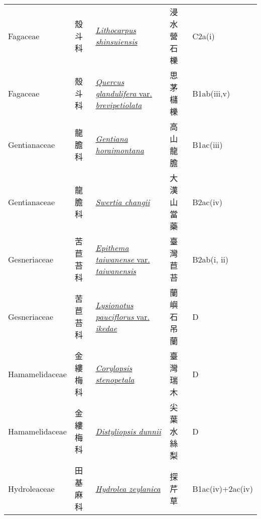 {\begin{longtable}{p{2.5cm}p{2.5cm}p{4.5cm}p{2.5cm}p{3cm}}
    Fagaceae & 殼斗科 & \href{http://www.theplantlist.org/tpl1.1/search?q=Lithocarpus+shinsuiensis}{\textit{Lithocarpus shinsuiensis} } & 浸水營石櫟 & C2a(i) \index{Lithocarpus@\textit{Lithocarpus}!shinsuiensis@\textit{shinsuiensis}}  \index{浸水營石櫟} \\
    Fagaceae & 殼斗科 & \href{http://www.theplantlist.org/tpl1.1/search?q=Quercus+glandulifera+var.+brevipetiolata}{\textit{Quercus glandulifera} var. \textit{brevipetiolata} } & 思茅櫧櫟 & B1ab(iii,v) \index{Quercus@\textit{Quercus}!glandulifera@\textit{glandulifera}!var. brevipetiolata@var. \textit{brevipetiolata}}  \index{思茅櫧櫟} \\
    Gentianaceae & 龍膽科 & \href{http://www.theplantlist.org/tpl1.1/search?q=Gentiana+horaimontana}{\textit{Gentiana horaimontana} } & 高山龍膽 & B1ac(iii) \index{Gentiana@\textit{Gentiana}!horaimontana@\textit{horaimontana}}  \index{高山龍膽} \\
    Gentianaceae & 龍膽科 & \href{http://www.theplantlist.org/tpl1.1/search?q=Swertia+changii}{\textit{Swertia changii} } & 大漢山當藥 & B2ac(iv) \index{Swertia@\textit{Swertia}!changii@\textit{changii}}  \index{大漢山當藥} \\
    Gesneriaceae & 苦苣苔科 & \href{http://www.theplantlist.org/tpl1.1/search?q=Epithema+taiwanense+var.+taiwanensis}{\textit{Epithema taiwanense} var. \textit{taiwanensis} } & 臺灣苣苔 & B2ab(i, ii) \index{Epithema@\textit{Epithema}!taiwanense@\textit{taiwanense}!var. taiwanensis@var. \textit{taiwanensis}}  \index{臺灣苣苔} \\
    Gesneriaceae & 苦苣苔科 & \href{http://www.theplantlist.org/tpl1.1/search?q=Lysionotus+pauciflorus+var.+ikedae}{\textit{Lysionotus pauciflorus} var. \textit{ikedae} } & 蘭嶼石吊蘭 & D \index{Lysionotus@\textit{Lysionotus}!pauciflorus@\textit{pauciflorus}!var. ikedae@var. \textit{ikedae}}  \index{蘭嶼石吊蘭} \\
    Hamamelidaceae & 金縷梅科 & \href{http://www.theplantlist.org/tpl1.1/search?q=Corylopsis+stenopetala}{\textit{Corylopsis stenopetala} } & 臺灣瑞木 & D \index{Corylopsis@\textit{Corylopsis}!stenopetala@\textit{stenopetala}}  \index{臺灣瑞木} \\
    Hamamelidaceae & 金縷梅科 & \href{http://www.theplantlist.org/tpl1.1/search?q=Distyliopsis+dunnii}{\textit{Distyliopsis dunnii} } & 尖葉水絲梨 & D \index{Distyliopsis@\textit{Distyliopsis}!dunnii@\textit{dunnii}}  \index{尖葉水絲梨} \\
    Hydroleaceae & 田基麻科 & \href{http://www.theplantlist.org/tpl1.1/search?q=Hydrolea+zeylanica}{\textit{Hydrolea zeylanica} } & 探芹草 & B1ac(iv)+2ac(iv) \index{Hydrolea@\textit{Hydrolea}!zeylanica@\textit{zeylanica}}  \index{探芹草} \\

\end{longtable}}
